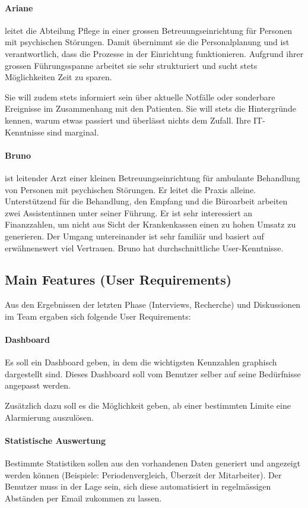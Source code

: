 \documentclass[a4paper]{scrreprt}
\begin{document}
\paragraph{Ariane} leitet die Abteilung Pflege in einer grossen Betreuungseinrichtung für Personen mit psychischen Störungen. Damit übernimmt sie die Personalplanung und ist verantwortlich, dass die Prozesse in der Einrichtung funktionieren. Aufgrund ihrer grossen Führungsspanne arbeitet sie sehr strukturiert und sucht stets Möglichkeiten Zeit zu sparen.

Sie will zudem stets informiert sein über aktuelle Notfälle oder sonderbare Ereignisse im Zusammenhang mit den Patienten. Sie will stets die Hintergründe kennen, warum etwas passiert und überlässt nichts dem Zufall. Ihre IT-Kenntnisse sind marginal.


\paragraph{Bruno} ist leitender Arzt einer kleinen Betreuungseinrichtung für ambulante Behandlung von Personen mit psychischen Störungen. Er leitet die Praxis alleine. Unterstützend für die Behandlung, den Empfang und die Büroarbeit arbeiten zwei Assistentinnen unter seiner Führung. Er ist sehr interessiert an Finanzzahlen, um nicht aus Sicht der Krankenkassen einen zu hohen Umsatz zu generieren. Der Umgang untereinander ist sehr familiär und basiert auf erwähnenswert viel Vertrauen. Bruno hat durchschnittliche User-Kenntnisse.


\subsection{Main Features (User Requirements)}
Aus den Ergebnissen der letzten Phase (Interviews, Recherche) und Diskussionen im Team ergaben sich folgende User Requirements:

\paragraph{Dashboard}
Es soll ein Dashboard geben, in dem die wichtigsten Kennzahlen graphisch dargestellt sind. Dieses Dashboard soll vom Benutzer selber auf seine Bedürfnisse angepasst werden. 

Zusätzlich dazu soll es die Möglichkeit geben, ab einer bestimmten Limite eine Alarmierung auszulösen. 

\paragraph{Statistische Auswertung}
Bestimmte Statistiken sollen aus den vorhandenen Daten generiert und angezeigt werden können (Beispiele: Periodenvergleich, Überzeit der Mitarbeiter). Der Benutzer muss in der Lage sein, sich diese automatisiert in regelmässigen Abständen per Email zukommen zu lassen.
\end{document}
